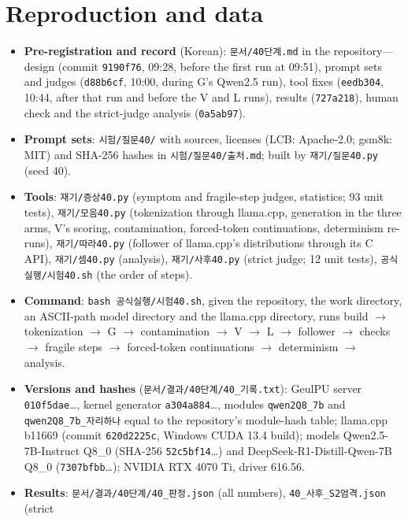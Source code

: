 \documentclass[11pt]{article}
\begin{document}
\section{Reproduction and data}\label{app:repro}

\sloppy
\begin{itemize}[noitemsep]
\item \textbf{Pre-registration and record} (Korean): \texttt{문서/40단계.md} in the repository---design (commit
      \texttt{9190f76}, 09:28, before the first run at 09:51), prompt sets and judges (\texttt{d88b6cf}, 10:00, during G's
      Qwen2.5 run), tool fixes (\texttt{eedb304}, 10:44, after that run and before the V and L runs), results
      (\texttt{727a218}), human check and the strict-judge analysis (\texttt{0a5ab97}).
\item \textbf{Prompt sets}: \texttt{시험/질문40/} with sources, licenses (LCB: Apache-2.0; gsm8k: MIT) and SHA-256 hashes in
      \texttt{시험/질문40/출처.md}; built by \texttt{재기/질문40.py} (seed 40).
\item \textbf{Tools}: \texttt{재기/증상40.py} (symptom and fragile-step judges, statistics; 93 unit tests),
      \texttt{재기/모음40.py} (tokenization through llama.cpp, generation in the three arms, V's scoring, contamination,
      forced-token continuations, determinism re-runs), \texttt{재기/따라40.py} (follower of llama.cpp's distributions
      through its C API), \texttt{재기/셈40.py} (analysis), \texttt{재기/사후40.py} (strict judge; 12 unit tests),
      \texttt{공식실행/시험40.sh} (the order of steps).
\item \textbf{Command}: \texttt{bash 공식실행/시험40.sh}, given the repository, the work directory, an ASCII-path model
      directory and the llama.cpp directory, runs build $\to$ tokenization $\to$ G $\to$ contamination $\to$ V $\to$ L
      $\to$ follower $\to$ checks $\to$ fragile steps $\to$ forced-token continuations $\to$ determinism $\to$ analysis.
\item \textbf{Versions and hashes} (\texttt{문서/결과/40단계/40\_기록.txt}): GeulPU server \texttt{010f5dae}\dots, kernel
      generator \texttt{a304a884}\dots, modules \texttt{qwen2Q8\_7b} and \texttt{qwen2Q8\_7b\_자리하나} equal to the
      repository's module-hash table; llama.cpp b11669 (commit \texttt{620d2225c}, Windows CUDA 13.4 build); models
      Qwen2.5-7B-Instruct Q8\_0 (SHA-256 \texttt{52c5bf14}\dots) and DeepSeek-R1-Distill-Qwen-7B Q8\_0
      (\texttt{7307bfbb}\dots); NVIDIA RTX 4070 Ti, driver 616.56.
\item \textbf{Results}: \texttt{문서/결과/40단계/40\_판정.json} (all numbers), \texttt{40\_사후\_S2엄격.json} (strict

\end{itemize}
\end{document}
